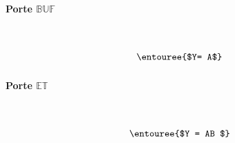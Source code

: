 \documentclass{report}
\begin{document}
\begin{multicols*}{3}
    \paragraph{Porte $\mathbb{BUF}$}
    \mbox{}\vspace{1em}\\
    \begin{minipage}{\columnwidth}
        \begin{minipage}[b]{0.5\columnwidth}
            \centering
            \bufgate
        \end{minipage}%
        \begin{minipage}[b]{0.5\columnwidth}
            \centering
        \end{minipage}
    \end{minipage}
    \[\entouree{$Y= A$} \]



    \paragraph{Porte $\mathbb{ET}$}
    \mbox{}\vspace{1em}\\
    \begin{minipage}{\columnwidth}
        \begin{minipage}[b]{0.5\columnwidth}
            \centering
            \andgate
        \end{minipage}%
        \begin{minipage}[b]{0.5\columnwidth}
            \centering
        \end{minipage}
    \end{minipage}
    \[\entouree{$Y = AB $} \]




\end{multicols*}
\end{document}
